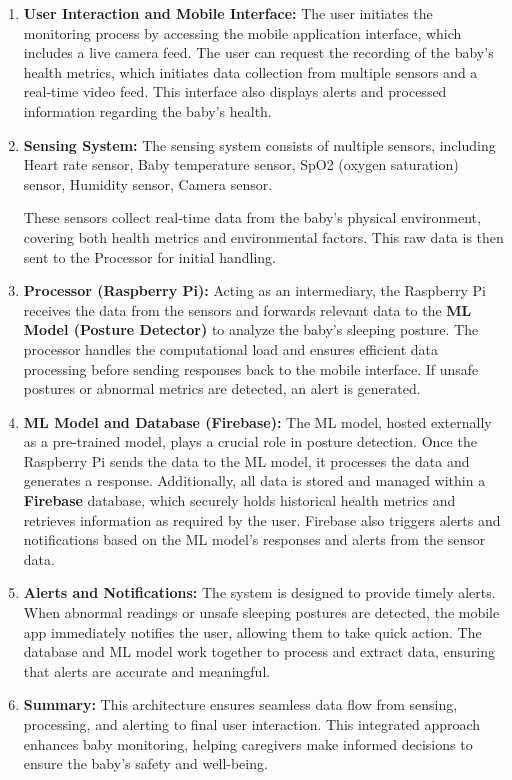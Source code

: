 \documentclass[12pt,a4paper]{report}
\begin{document}
\begin{enumerate}
\item \textbf{User Interaction and Mobile Interface:} The user initiates the monitoring process by accessing the mobile application interface, which includes a live camera feed. The user can request the recording of the baby’s health metrics, which initiates data collection from multiple sensors and a real-time video feed. This interface also displays alerts and processed information regarding the baby’s health.
\item \textbf{Sensing System:} The sensing system consists of multiple sensors, including Heart rate sensor, Baby temperature sensor, SpO2 (oxygen saturation) sensor, Humidity sensor, Camera sensor.

These sensors collect real-time data from the baby’s physical environment, covering both health metrics and environmental factors. This raw data is then sent to the Processor for initial handling.

\item \textbf{Processor (Raspberry Pi):} Acting as an intermediary, the Raspberry Pi receives the data from the sensors and forwards relevant data to the \textbf{ML Model (Posture Detector)} to analyze the baby’s sleeping posture. The processor handles the computational load and ensures efficient data processing before sending responses back to the mobile interface. If unsafe postures or abnormal metrics are detected, an alert is generated.

\item \textbf{ML Model and Database (Firebase):} The ML model, hosted externally as a pre-trained model, plays a crucial role in posture detection. Once the Raspberry Pi sends the data to the ML model, it processes the data and generates a response. Additionally, all data is stored and managed within a \textbf{Firebase} database, which securely holds historical health metrics and retrieves information as required by the user. Firebase also triggers alerts and notifications based on the ML model’s responses and alerts from the sensor data.

\item \textbf{Alerts and Notifications:} The system is designed to provide timely alerts. When abnormal readings or unsafe sleeping postures are detected, the mobile app immediately notifies the user, allowing them to take quick action. The database and ML model work together to process and extract data, ensuring that alerts are accurate and meaningful.

\item \textbf{Summary:} This architecture ensures seamless data flow from sensing, processing, and alerting to final user interaction. This integrated approach enhances baby monitoring, helping caregivers make informed decisions to ensure the baby's safety and well-being.
\end{enumerate}
\end{document}
